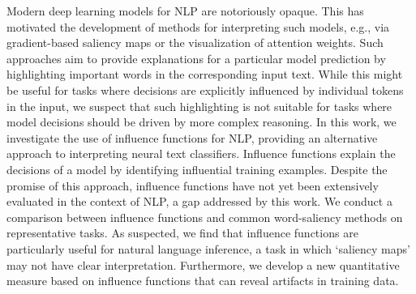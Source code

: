 Modern deep learning models for NLP are notoriously opaque. This has motivated the development of methods for interpreting such models, e.g., via gradient-based saliency maps or the visualization of attention weights. Such approaches aim to provide explanations for a particular model prediction by highlighting important words in the corresponding input text. While this might be useful for tasks where decisions are explicitly influenced by individual tokens in the input, we suspect that such highlighting is not suitable for tasks where model decisions should be driven by more complex reasoning. In this work, we investigate the use of influence functions for NLP, providing an alternative approach to interpreting neural text classifiers. Influence functions explain the decisions of a model by identifying influential training examples. Despite the promise of this approach, influence functions have not yet been extensively evaluated in the context of NLP, a gap addressed by this work. We conduct a comparison between influence functions and common word-saliency methods on representative tasks. As suspected, we find that influence functions are particularly useful for natural language inference, a task in which `saliency maps' may not have clear interpretation. Furthermore, we develop a new quantitative measure based on influence functions that can reveal artifacts in training data.
